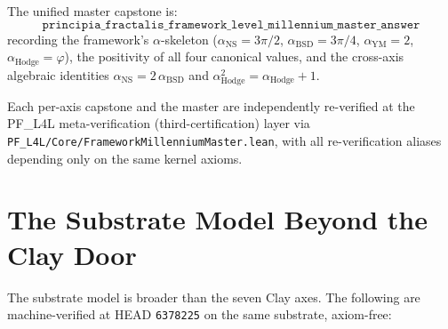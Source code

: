 \documentclass[11pt,a4paper,reqno]{amsart}
\theoremstyle{plain}
\theoremstyle{definition}
\theoremstyle{remark}
\newcommand{\code}[1]{\texttt{#1}}
\begin{document}
The unified master capstone is:
\begin{equation*}
  \code{principia\_fractalis\_framework\_level\_millennium\_master\_answer}
\end{equation*}
recording the framework's $\alpha$-skeleton ($\alpha_{\mathrm{NS}} =
3\pi/2$, $\alpha_{\mathrm{BSD}} = 3\pi/4$, $\alpha_{\mathrm{YM}} = 2$,
$\alpha_{\mathrm{Hodge}} = \varphi$), the positivity of all four
canonical values, and the cross-axis algebraic identities
$\alpha_{\mathrm{NS}} = 2\,\alpha_{\mathrm{BSD}}$ and
$\alpha_{\mathrm{Hodge}}^{2} = \alpha_{\mathrm{Hodge}} + 1$.

Each per-axis capstone and the master are independently
re-verified at the PF\_L4L meta-verification (third-certification)
layer via
\code{PF\_L4L/Core/FrameworkMillenniumMaster.lean}, with all
re-verification aliases depending only on the same kernel axioms.

\section{The Substrate Model Beyond the Clay Door}
\label{sec:beyond-clay}

The substrate model is broader than the seven Clay axes. The following
are machine-verified at HEAD \texttt{6378225} on the same substrate,
axiom-free:
\end{document}
